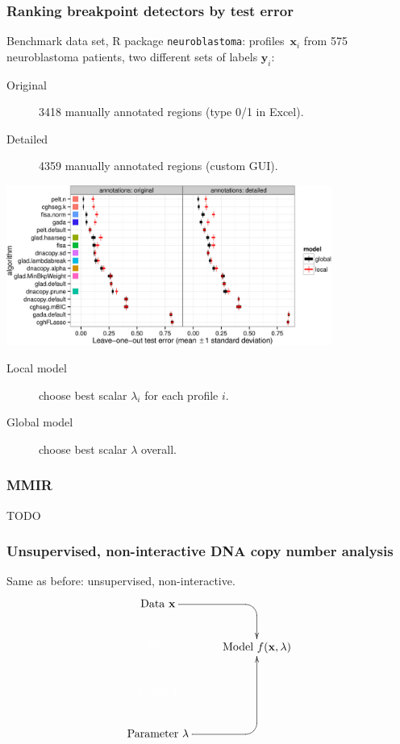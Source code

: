 \documentclass{beamer}
\begin{document}
\begin{frame}
  \frametitle{Ranking breakpoint detectors by test error}

  Benchmark data set, R package \texttt{neuroblastoma}:
  profiles~$\mathbf x_i$ from 575 neuroblastoma patients, two
  different sets of labels $\mathbf y_i$:
  \begin{description}
  \item[Original] 3418 manually annotated regions (type 0/1 in Excel).
  \item[Detailed] 4359 manually annotated regions (custom GUI).
  \end{description}

  \begin{center}
      \includegraphics[width=0.8\textwidth]{bams-test-error}
  \end{center}

  \begin{description}
  \item[Local model] choose best scalar $\lambda_i$ for each profile $i$.\\
  \item[Global model] choose best scalar $\lambda$ overall.
  \end{description}
\end{frame}

\begin{frame}
  \frametitle{MMIR}
  TODO
\end{frame}

\begin{frame}
  \frametitle{Unsupervised, non-interactive DNA copy number analysis}
  Same as before: unsupervised, non-interactive.
  \begin{displaymath}
  \xymatrix{
    \text{Data $\mathbf x$}
    \ar `[r] [dr] 
    & \text{ }
    \\
    \color{white}{\text{Plot} }
    & 
    \text{Model $f(\mathbf x, \lambda)$} 
    \\
    \color{white}{\text{Labels $\mathbf y$}       }
    \\
    \text{Parameter $\lambda$} 
    \ar `r[ruu] [ruu]
    & \text{ }
  }
  \end{displaymath}
\end{frame}
\end{document}
